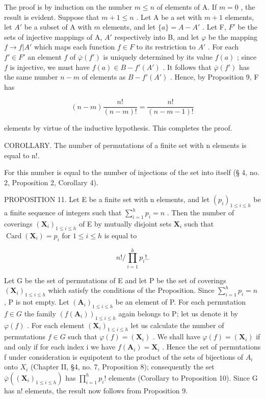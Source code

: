 The proof is by induction on the number \(m \leqslant n\) of elements of A. If \(m = 0\) , the result is evident. Suppose that \(m + 1 \leqslant n\) . Let A be a set with \(m + 1\) elements, let \(A'\) be a subset of A with \(m\) elements, and let \(\{a\} = A - A'\) . Let F, \(F'\) be the sets of injective mappings of A, \(A'\) respectively into B, and let \(\varphi\) be the mapping \(f \to f|A'\) which maps each function \(f \in F\) to its restriction to \(A'\) . For each \(f' \in F'\) an element \(f\) of \(\overline{\varphi}(f')\) is uniquely determined by its value \(f(a)\) ; since \(f\) is injective, we must have \(f(a) \in B - f'(A')\) . It follows that \(\overline{\varphi}(f')\) has the same number \(n - m\) of elements as \(B - f'(A')\) . Hence, by Proposition 9, F has

\[
(n - m) \frac {n !}{(n - m) !} = \frac {n !}{(n - m - 1) !}
\]

elements by virtue of the inductive hypothesis. This completes the proof.

COROLLARY. The number of permutations of a finite set with n elements is equal to n!.

For this number is equal to the number of injections of the set into itself (§ 4, no. 2, Proposition 2, Corollary 4).

PROPOSITION 11. Let E be a finite set with n elements, and let \((p_i)_{1 \leqslant i \leqslant h}\) be a finite sequence of integers such that \(\sum_{i=1}^{h} p_i = n\) . Then the number of coverings \((\mathbf{X}_i)_{1 \leqslant i \leqslant h}\) of E by mutually disjoint sets \(\mathbf{X}_i\) such that \(\operatorname{Card}(\mathbf{X}_i) = p_i\) for \(1 \leqslant i \leqslant h\) is equal to

\[
n! / \prod_ {i = 1} ^ {h} p _ {i}!.
\]

Let G be the set of permutations of E and let P be the set of coverings \((\mathbf{X}_{i})_{1\leqslant i\leqslant h}\) which satisfy the conditions of the Proposition. Since \(\sum_{i=1}^{h}p_{i}=n\) , P is not empty. Let \((\mathbf{A}_{i})_{1\leqslant i\leqslant h}\) be an element of P. For each permutation \(f\in G\) the family \((f(\mathbf{A}_{i}))_{1\leqslant i\leqslant h}\) again belongs to P; let us denote it by \(\varphi(f)\) . For each element \((\mathbf{X}_{i})_{1\leqslant i\leqslant h}\) let us calculate the number of permutations \(f\in G\) such that \(\varphi(f)=(\mathbf{X}_{i})\) . We shall have \(\varphi(f)=(\mathbf{X}_{i})\) if and only if for each index i we have \(f(\mathbf{A}_{i})=\mathbf{X}_{i}\) . Hence the set of permutations f under consideration is equipotent to the product of the sets of bijections of \(A_{i}\) onto \(X_{i}\) (Chapter II, §4, no. 7, Proposition 8); consequently the set \(\overline{\varphi}((\mathbf{X}_{i})_{1\leqslant i\leqslant h})\) has \(\prod_{i=1}^{h}p_{i}!\) elements (Corollary to Proposition 10). Since G has n! elements, the result now follows from Proposition 9.

